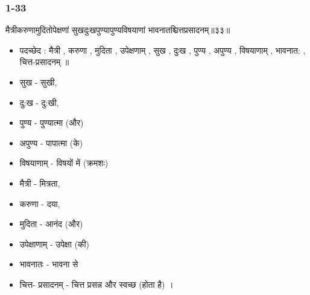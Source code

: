 \begin{frame}[fragile]\frametitle{1-33}
\begin{sanskrit}
मैत्रीकरुणामुदितोपेक्षणां सुखदुःखपुण्यापुण्यविषयाणां भावनातश्चित्तप्रसादनम्॥३३॥
\end{sanskrit}

	\begin{itemize}
	\item पदच्छेद : मैत्री , करुणा , मुदिता , उपेक्षणाम् , सुख , दुःख , पुण्य , अपुण्य , विषयाणाम् , भावनात: , चित्त-प्रसादनम् ॥
	\item सुख - सुखी,
	\item दु:ख - दु:खी,
	\item पुण्य - पुण्यात्मा (और)
	\item अपुण्य - पापात्मा (के)
	\item विषयाणाम् - विषयों में (क्रमशः)
	\item मैत्री - मित्रता,
	\item करुणा - दया,
	\item मुदिता - आनंद (और)
	\item उपेक्षाणाम् - उपेक्षा (की)
	\item भावनातः - भावना से
	\item चित्त- प्रसादनम् - चित्त प्रसन्न और स्वच्छ (होता है) ।

	\end{itemize}	
\end{frame}

